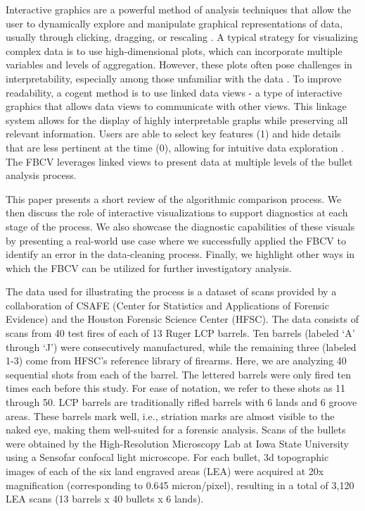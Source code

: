 \documentclass[
  12pt]{article}
\begin{document}
Interactive graphics are a powerful method of analysis techniques that
allow the user to dynamically explore and manipulate graphical
representations of data, usually through clicking, dragging, or
rescaling
\citep{eickHighInteractionGraphics1995, swayneIntroductionSpecialIssue1999, urbanekIPlotsEXtremeNextgeneration2011}.
A typical strategy for visualizing complex data is to use
high-dimensional plots, which can incorporate multiple variables and
levels of aggregation. However, these plots often pose challenges in
interpretability, especially among those unfamiliar with the data
\citep{willsLinkedDataViews2008}. To improve readability, a cogent
method is to use linked data views - a type of interactive graphics that
allows data views to communicate with other views. This linkage system
allows for the display of highly interpretable graphs while preserving
all relevant information. Users are able to select key features (1) and
hide details that are less pertinent at the time (0), allowing for
intuitive data exploration \citep{willsLinkedDataViews2008}. The FBCV
leverages linked views to present data at multiple levels of the bullet
analysis process.

This paper presents a short review of the algorithmic comparison
process. We then discuss the role of interactive visualizations to
support diagnostics at each stage of the process. We also showcase the
diagnostic capabilities of these visuals by presenting a real-world use
case where we successfully applied the FBCV to identify an error in the
data-cleaning process. Finally, we highlight other ways in which the
FBCV can be utilized for further investigatory analysis.

The data used for illustrating the process is a dataset of scans
provided by a collaboration of CSAFE (Center for Statistics and
Applications of Forensic Evidence) and the Houston Forensic Science
Center (HFSC). The data consists of scans from 40 test fires of each of
13 Ruger LCP barrels. Ten barrels (labeled `A' through `J') were
consecutively manufactured, while the remaining three (labeled 1-3) come
from HFSC's reference library of firearms. Here, we are analyzing 40
sequential shots from each of the barrel. The lettered barrels were only
fired ten times each before this study. For ease of notation, we refer
to these shots as 11 through 50. LCP barrels are traditionally rifled
barrels with 6 lands and 6 groove areas. These barrels mark well, i.e.,
striation marks are almost visible to the naked eye, making them
well-suited for a forensic analysis. Scans of the bullets were obtained
by the High-Resolution Microscopy Lab at Iowa State University using a
Sensofar confocal light microscope. For each bullet, 3d topographic
images of each of the six land engraved areas (LEA) were acquired at 20x
magnification (corresponding to 0.645 micron/pixel), resulting in a
total of 3,120 LEA scans (13 barrels x 40 bullets x 6 lands).
\end{document}
